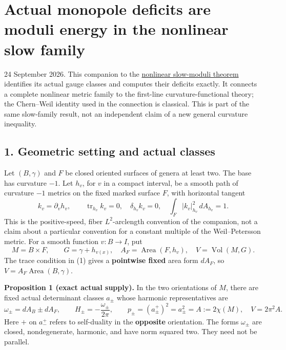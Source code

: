 \documentclass[
  11pt,
]{article}
\author{}
\date{}
\begin{document}
\hypertarget{actual-monopole-deficits-are-moduli-energy-in-the-nonlinear-slow-family}{%
\section{Actual monopole deficits are moduli energy in the nonlinear
slow
family}\label{actual-monopole-deficits-are-moduli-energy-in-the-nonlinear-slow-family}}

24 September 2026. This companion to the
\href{20260924_nonlinear_slow_moduli.md}{nonlinear slow-moduli theorem}
identifies its actual gauge classes and computes their deficits exactly.
It connects a complete nonlinear metric family to the first-line
curvature-functional theory; the Chern--Weil identity used in the
connection is classical. This is part of the same slow-family result,
not an independent claim of a new general curvature inequality.

\hypertarget{geometric-setting-and-actual-classes}{%
\subsection{1. Geometric setting and actual
classes}\label{geometric-setting-and-actual-classes}}

Let \((B,\gamma)\) and \(F\) be closed oriented surfaces of genera at
least two. The base has curvature \(-1\). Let \(h_v\), for \(v\) in a
compact interval, be a smooth path of curvature \(-1\) metrics on the
fixed marked surface \(F\), with horizontal tangent \[
 k_v=\partial_vh_v,\qquad
 \operatorname{tr}_{h_v}k_v=0,\quad\delta_{h_v}k_v=0,
 \quad\int_F|k_v|_{h_v}^2\,dA_{h_v}=1.                 \tag{1}
\] This is the positive-speed, fiber \(L^2\)-arclength convention of the
companion, not a claim about a particular convention for a constant
multiple of the Weil--Petersson metric. For a smooth function
\(v:B\to I\), put \[
 M=B\times F,\qquad G=\gamma+h_{v(x)},\quad
 A_F=\operatorname{Area}(F,h_v),\quad V=\operatorname{Vol}(M,G).
                                                               \tag{2}
\] The trace condition in (1) gives a \textbf{pointwise fixed} area form
\(dA_F\), so \(V=A_F\operatorname{Area}(B,\gamma)\).

\textbf{Proposition 1 (exact actual supply).} In the two orientations of
\(M\), there are fixed actual determinant classes \(a_\pm\) whose
harmonic representatives are \[
 \omega_\pm=dA_B\pm dA_F,\qquad
 H_\pm=-\frac{\omega_\pm}{2\pi},\qquad
 p_\pm=(a_\pm^+)^2=a_\pm^2=A:=2\chi(M),\quad V=2\pi^2A.
                                                               \tag{3}
\] Here \(+\) on \(a_-^+\) refers to self-duality in the
\textbf{opposite} orientation. The forms \(\omega_\pm\) are closed,
nondegenerate, harmonic, and have norm squared two. They need not be
parallel.
\end{document}
